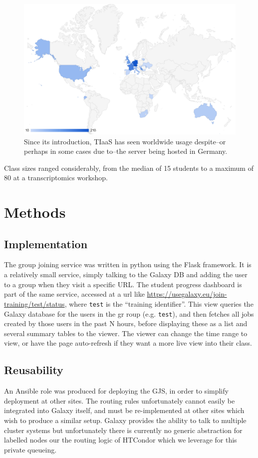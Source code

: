 \documentclass[a4paper,num-refs]{oup-contemporary}
\begin{document}
\begin{figure}[bt!]
\centering
\includegraphics[width=\linewidth]{images/map.png}
	\caption{Since its introduction, TIaaS has seen worldwide usage despite--or perhaps in some cases due to--the server being hosted in Germany.}\label{figure:map}
\end{figure}

Class sizes ranged considerably, from the median of 15 students to a maximum of 80 at a transcriptomics workshop.


\section{Methods}

\subsection{Implementation}
The group joining service was written in python using the Flask framework. It is a relatively small service, simply talking to the Galaxy DB and adding the user to a group when they visit a specific URL.
The student progress dashboard is part of the same service, accessed at a url like \url{https://usegalaxy.eu/join-training/test/status}, where \texttt{test} is the ``training identifier''. This view queries the Galaxy database for the users in the gr roup (e.g. \texttt{test}), and then fetches all jobs created by those users in the past N hours, before displaying these as a list and several summary tables to the viewer. The viewer can change the time range to view, or have the page auto-refresh if they want a more live view into their class.

\subsection{Reusability}
An Ansible role was produced for deploying the GJS, in order to simplify deployment at other sites. The routing rules unfortunately cannot easily be integrated into Galaxy itself, and must be re-implemented at other sites which wish to produce a similar setup. Galaxy provides the ability to talk to multiple cluster systems but unfortunately there is currently no generic abstraction for labelled nodes our the routing logic of HTCondor which we leverage for this private queueing.
\end{document}
